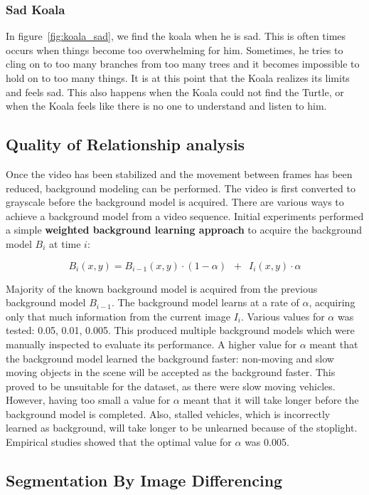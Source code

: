 \documentclass[conference]{IEEEtran}
\begin{document}
\subsubsection{Sad Koala}
In figure~\ref{fig:koala_sad}, we find the koala when he is sad. This is often times occurs when things become too overwhelming for him. Sometimes, he tries to cling on to too many branches from too many trees and it becomes impossible to hold on to too many things. It is at this point that the Koala realizes its limits and feels sad. This also happens when the Koala could not find the Turtle, or when the Koala feels like there is no one to understand and listen to him.

\subsection{Quality of Relationship analysis}
Once the video has been stabilized and the movement between frames has been reduced, background modeling can be performed. The video is first converted to grayscale before the background model is acquired. There are various ways to achieve a background model from a video sequence. Initial experiments performed a simple \textbf{weighted background learning approach} to acquire the background model $B_i$ at time $i$:

$$
B_i(x, y) = B_{i-1}(x, y) \cdot (1 - \alpha) \enspace + \enspace I_i(x,y) \cdot \alpha
$$

Majority of the known background model is acquired from the previous background model $B_{i-1}$. The background model learns at a rate of $\alpha$, acquiring only that much information from the current image $I_i$. Various values for $\alpha$ was tested: 0.05, 0.01, 0.005. This produced multiple background models which were manually inspected to evaluate its performance. A higher value for $\alpha$ meant that the background model learned the background faster: non-moving and slow moving objects in the scene will be accepted as the background faster. This proved to be unsuitable for the dataset, as there were slow moving vehicles. However, having too small a value for $\alpha$ meant that it will take longer before the background model is completed. Also, stalled vehicles, which is incorrectly learned as background, will take longer to be unlearned because of the stoplight. Empirical studies showed that the optimal value for $\alpha$ was 0.005.

\subsection{Segmentation By Image Differencing}
\end{document}

